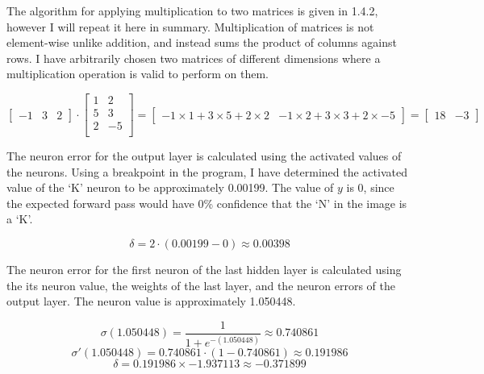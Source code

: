\documentclass{article}
\begin{document}
\begin{enumerate}
	The algorithm for applying multiplication to two matrices is given in 1.4.2, however I will repeat it here in summary. Multiplication of matrices is not element-wise unlike addition, and instead sums the product of columns against rows. I have arbitrarily chosen two matrices of different dimensions where a multiplication operation is valid to perform on them.

	\(\begin{bmatrix}
		-1 & 3 & 2
	\end{bmatrix}
	\cdot
	\begin{bmatrix}
		1 & 2 \\
		5 & 3 \\
		2 & -5 \\
	\end{bmatrix}
	=
	\begin{bmatrix}
		-1\times 1+3\times 5+2\times 2 & -1\times 2+3\times 3+2\times -5
	\end{bmatrix}
	=
	\begin{bmatrix}
		18 & -3
	\end{bmatrix}\)

    The neuron error for the output layer is calculated using the activated values of the neurons. Using a breakpoint in the program, I have determined the activated value of the `K' neuron to be approximately 0.00199. The value of \(y\) is 0, since the expected forward pass would have 0\% confidence that the `N' in the image is a `K'.

    \begin{equation*}
        \delta = 2\cdot (0.00199-0) \approx 0.00398
    \end{equation*}

    The neuron error for the first neuron of the last hidden layer is calculated using the its neuron value, the weights of the last layer, and the neuron errors of the output layer. The neuron value is approximately 1.050448.

    \begin{equation*}
        \sigma(1.050448) = \frac{1}{1+e^{-(1.050448)}} \approx 0.740861
    \end{equation*}
    \begin{equation*}
        \sigma'(1.050448) = 0.740861\cdot(1-0.740861) \approx 0.191986
    \end{equation*}
     \begin{equation*}
        \delta = 0.191986\times -1.937113 \approx -0.371899
    \end{equation*}


\end{enumerate}
\end{document}

